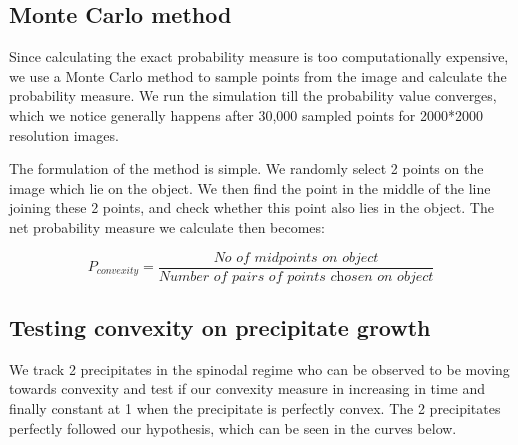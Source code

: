 \documentclass[12pt, a4paper]{report}
\begin{document}
\subsection{Monte Carlo method}
Since calculating the exact probability measure is too computationally expensive, we use a Monte Carlo method to sample points from the image and calculate the probability measure. We run the simulation till the probability value converges, which we notice generally happens after 30,000 sampled points for 2000*2000 resolution images.

The formulation of the method is simple. We randomly select 2 points on the image which lie on the object. We then find the point in the middle of the line joining these 2 points, and check whether this point also lies in the object. The net probability measure we calculate then becomes:

\begin{equation}
    P_{convexity} = \frac{\textit{No of midpoints on object}}{\textit{Number of pairs of points chosen on object}}
\end{equation}


\subsection{Testing convexity on precipitate growth}
We track 2 precipitates in the spinodal regime who can be observed to be moving towards convexity and test if our convexity measure in increasing in time and finally constant at 1 when the precipitate is perfectly convex. The 2 precipitates perfectly followed our hypothesis, which can be seen in the curves below. 
\end{document}
